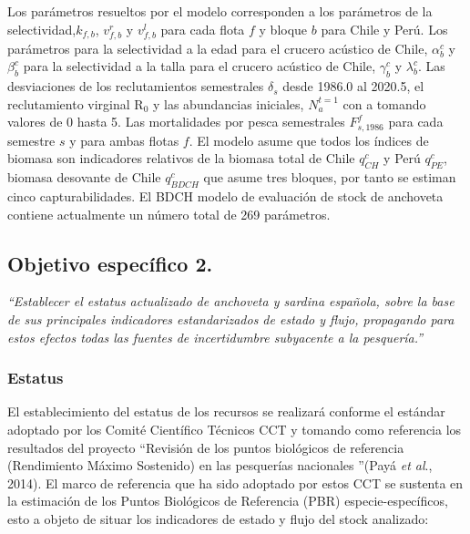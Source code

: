 \documentclass[letter,11pt]{article}
\begin{document}
Los par\'ametros resueltos por el modelo corresponden a los par\'ametros de
la selectividad,$k_{f,b}$, $v^r_{f,b}$ y $v^l_{f,b}$ para cada
flota $f$ y bloque $b$ para Chile y Per\'u. Los par\'ametros para la
selectividad a la edad para el crucero ac\'ustico de Chile, $\alpha_b^c$
y $\beta_b^c$ para la selectividad a la talla para el crucero ac\'ustico
de Chile, $\gamma^c_b$ y $\lambda^c_b$. Las desviaciones de los
reclutamientos semestrales $\delta_s$ desde 1986.0 al 2020.5, el
reclutamiento virginal R$_{0}$ y las abundancias iniciales,
$N_a^{t=1}$ con a tomando valores de 0 hasta 5. Las mortalidades por
pesca semestrales $F^f_{s,1986}$ para cada semestre $s$ y para ambas
flotas $f$. El modelo asume que todos los \'indices de biomasa son
indicadores relativos de la biomasa total de Chile $q^c_{CH}$ y Per\'u
$q^c_{PE}$, biomasa desovante de Chile $q^c_{BDCH}$ que asume tres
bloques, por tanto se estiman cinco capturabilidades. El BDCH modelo de
evaluaci\'on de stock de anchoveta contiene actualmente un n\'umero total de
269 par\'ametros.


\clearpage
\newpage

\subsection{Objetivo espec\'ifico 2.}

\textit{\textquotedblleft Establecer el estatus actualizado de anchoveta y sardina espa\~{n}ola, sobre la base de sus principales indicadores estandarizados de estado y flujo, propagando para estos efectos todas las fuentes de incertidumbre subyacente a la pesquer\'ia.\textquotedblright}
\vspace{-0.2cm}


\subsubsection{Estatus}

El establecimiento del estatus de los recursos se realizar\'a conforme el
est\'andar adoptado por los Comit\'e Cient\'ifico T\'ecnicos CCT y tomando como
referencia los resultados del proyecto \textquotedblleft Revisi\'on de los puntos
biol\'ogicos de referencia (Rendimiento M\'aximo Sostenido) en las
pesquer\'ias nacionales \textquotedblright (Pay\'a \textit{et al}., 2014). El marco de
referencia que ha sido adoptado por estos CCT se sustenta en la
estimaci\'on de los Puntos Biol\'ogicos de Referencia (PBR)
especie-espec\'ificos, esto a objeto de situar los indicadores de estado y
flujo del stock analizado:
\end{document}
